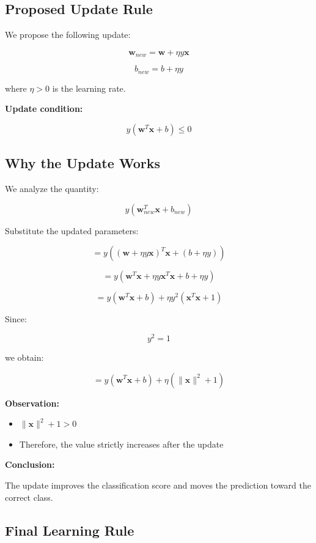 \documentclass[12pt,a4paper]{article}
\begin{document}
\subsection{Proposed Update Rule}

We propose the following update:

\[
\mathbf{w}_{new} = \mathbf{w} + \eta y \mathbf{x}
\]

\[
b_{new} = b + \eta y
\]

where $\eta > 0$ is the learning rate.

\textbf{Update condition:}

\[
y(\mathbf{w}^T \mathbf{x} + b) \leq 0
\]

\subsection{Why the Update Works}

We analyze the quantity:

\[
y(\mathbf{w}_{new}^T \mathbf{x} + b_{new})
\]

Substitute the updated parameters:

\[
= y \left( (\mathbf{w} + \eta y \mathbf{x})^T \mathbf{x} + (b + \eta y) \right)
\]

\[
= y \left( \mathbf{w}^T \mathbf{x} + \eta y \mathbf{x}^T \mathbf{x} + b + \eta y \right)
\]

\[
= y(\mathbf{w}^T \mathbf{x} + b) + \eta y^2 (\mathbf{x}^T \mathbf{x} + 1)
\]

Since:

\[
y^2 = 1
\]

we obtain:

\[
= y(\mathbf{w}^T \mathbf{x} + b) + \eta (\|\mathbf{x}\|^2 + 1)
\]

\textbf{Observation:}

\begin{itemize}
    \item $\|\mathbf{x}\|^2 + 1 > 0$
    \item Therefore, the value strictly increases after the update
\end{itemize}

\textbf{Conclusion:}

The update improves the classification score and moves the prediction toward the correct class.

\subsection{Final Learning Rule}
\end{document}
